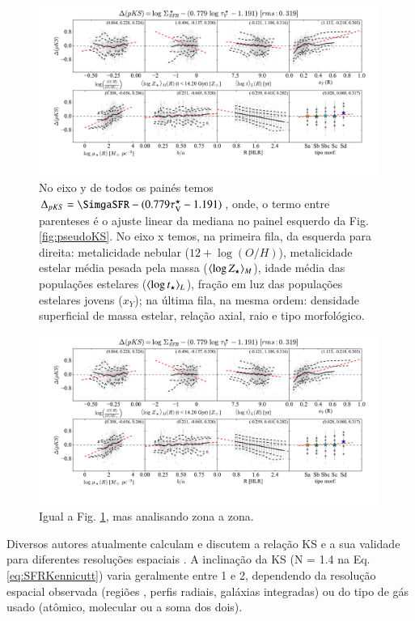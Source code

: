 \begin{figure}
	\centering
	\includegraphics[width=0.99\textwidth]{figuras/deltapKS.pdf}
	\caption[Resíduos da {\em pseudo-KS}.]
	{No eixo y de todos os painés temos $\Delta_{pKS} = \SimgaSFR - (0.779 \tauVS - 1.191)$, onde, o
termo entre parenteses é o ajuste linear da mediana no painel esquerdo da Fig. \ref{fig:pseudoKS}.
No eixo x temos, na primeira fila, da esquerda para direita: metalicidade nebular ($12 + \log
(O/H)$), metalicidade estelar média pesada pela massa ($\meanM{\log Z_\star}$), idade média das
populações estelares ($\meanL{\log t_\star}$), fração em luz das populações estelares jovens
($x_Y$); na última fila, na mesma ordem: densidade superficial de massa estelar, relação axial, raio
e tipo morfológico.}
	\label{fig:pseudoKSresid}
\end{figure}

\begin{figure}
	\centering
	\includegraphics[width=0.99\textwidth]{figuras/deltapKS.pdf}
	\caption[Resíduos da {\em pseudo-KS}.]
	{Igual a Fig. \ref{fig:pseudoKSresid}, mas analisando zona a zona.}
	\label{fig:pseudoKSresidZonas}
\end{figure}

Diversos autores atualmente calculam e discutem a relação KS e a sua validade para diferentes
resoluções espaciais \citep[e.g., ][]{Kennicutt.etal.2007a, Leroy.etal.2012a,
Calzetti.Liu.Koda.2012a, Lada.etal.2013a, Tacconi.etal.2013a, Casasola.etal.2015a}. A inclinação
da KS (N = 1.4 na Eq. \ref{eq:SFRKennicutt}) varia geralmente entre 1 e 2, dependendo da resolução
espacial observada (regiões \Hii, perfis radiais, galáxias integradas) ou do tipo de gás usado
(atômico, molecular ou a soma dos dois).

